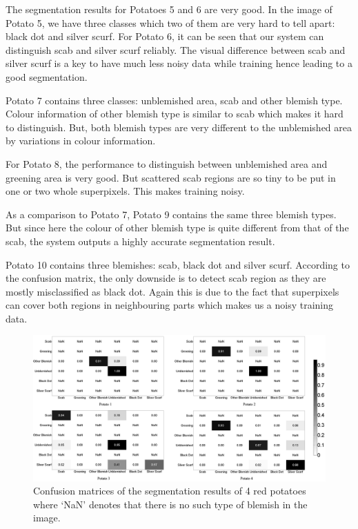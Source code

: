 \documentclass[twocolumn]{svjour3}          %
\begin{document}
The segmentation results for Potatoes 5 and 6 are very good. In the image of Potato 5, we have three classes which two of them are very hard to tell apart: black dot and silver scurf. For Potato 6, it can be seen that our system can distinguish scab and silver scurf reliably. The visual difference between scab and silver scurf is a key to have  much less noisy data while training hence leading to a good segmentation.

Potato 7 contains three classes: unblemished area, scab and other blemish type. Colour information of other blemish type is similar to scab which makes it hard to distinguish. But, both blemish types are very different to the unblemished area by variations in colour information.

For Potato 8, the performance to distinguish between unblemished area and greening area is very good. But scattered scab regions are so tiny to be put in one or two whole superpixels. This makes training noisy.

As a comparison to Potato 7, Potato 9 contains the same three blemish types. But since here the colour of other blemish type is quite different from that of the scab, the system outputs a highly accurate segmentation result.  

Potato 10 contains three blemishes: scab, black dot and silver scurf. According to the confusion matrix, the only downside is to detect scab region as they are mostly misclassified as black dot. Again this is due to the fact that superpixels can cover both regions in neighbouring parts which makes us a noisy training data. 

\begin{figure} [t]
\centering
\includegraphics[width=1\linewidth]{r4.jpg}
\caption{Confusion matrices of the segmentation results of 4 red potatoes where `NaN' denotes that there is no such type of blemish in the image.}
\label{fig:r4}
\end{figure}
\end{document}
